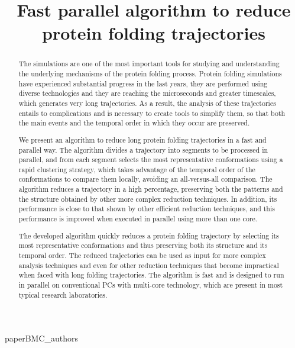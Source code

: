 \documentclass[american,twocolumn]{bmcart}
\begin{document}
\begin{frontmatter}
\begin{fmbox}

\title{Fast parallel algorithm to reduce protein folding trajectories}

\maketitle
 {paperBMC_authors}

\begin{abstractbox}
\begin{abstract}
 The simulations are one of the most important tools for studying and understanding the underlying mechanisms of the protein folding process. Protein folding simulations have experienced substantial progress in the last years, they are performed using diverse technologies and they are reaching the microseconds and greater timescales, which generates very long trajectories. As a result, the analysis of these trajectories entails to complications and is necessary to create tools to simplify them, so that both the main events and the temporal order in which they occur are preserved.

 We present an algorithm to reduce long protein folding trajectories in a fast and parallel way. The algorithm divides a trajectory into segments to be processed in parallel, and from each segment selects the most representative conformations using a rapid clustering strategy, which takes advantage of the temporal order of the conformations to compare them locally, avoiding an all-versus-all comparison. The algorithm reduces a trajectory in a high percentage, preserving both the patterns and the structure obtained by other more complex reduction techniques. In addition, its performance is close to that shown by other efficient reduction techniques, and this performance is improved when executed in parallel using more than one core.

 The developed algorithm quickly reduces a protein folding trajectory by selecting its most representative conformations and thus preserving both its structure and its temporal order. The reduced trajectories can be used as input for more complex analysis techniques and even for other reduction techniques that become impractical when faced with long folding trajectories. The algorithm is fast and is designed to run in parallel on conventional PCs with multi-core technology, which are present in most typical research laboratories.
\end{abstract}
\begin{keyword}
\end{keyword}

\end{abstractbox}
\end{fmbox}%
\end{frontmatter}
\end{document}
